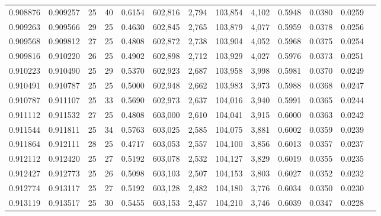 \begin{tabular}{rrrrrrrrrrrrr}
0.908876 & 0.909257 &    25 &  40 &                                     0.6154 & 602,816 &   2,794 & 103,854 &   4,102 & 0.5948 & 0.0380 & 0.0259 \\
0.909263 & 0.909566 &    29 &  25 &                                     0.4630 & 602,845 &   2,765 & 103,879 &   4,077 & 0.5959 & 0.0378 & 0.0256 \\
0.909568 & 0.909812 &    27 &  25 &                                     0.4808 & 602,872 &   2,738 & 103,904 &   4,052 & 0.5968 & 0.0375 & 0.0254 \\
0.909816 & 0.910220 &    26 &  25 &                                     0.4902 & 602,898 &   2,712 & 103,929 &   4,027 & 0.5976 & 0.0373 & 0.0251 \\
0.910223 & 0.910490 &    25 &  29 &                                     0.5370 & 602,923 &   2,687 & 103,958 &   3,998 & 0.5981 & 0.0370 & 0.0249 \\
0.910491 & 0.910787 &    25 &  25 &                                     0.5000 & 602,948 &   2,662 & 103,983 &   3,973 & 0.5988 & 0.0368 & 0.0247 \\
0.910787 & 0.911107 &    25 &  33 &                                     0.5690 & 602,973 &   2,637 & 104,016 &   3,940 & 0.5991 & 0.0365 & 0.0244 \\
0.911112 & 0.911532 &    27 &  25 &                                     0.4808 & 603,000 &   2,610 & 104,041 &   3,915 & 0.6000 & 0.0363 & 0.0242 \\
0.911544 & 0.911811 &    25 &  34 &                                     0.5763 & 603,025 &   2,585 & 104,075 &   3,881 & 0.6002 & 0.0359 & 0.0239 \\
0.911864 & 0.912111 &    28 &  25 &                                     0.4717 & 603,053 &   2,557 & 104,100 &   3,856 & 0.6013 & 0.0357 & 0.0237 \\
0.912112 & 0.912420 &    25 &  27 &                                     0.5192 & 603,078 &   2,532 & 104,127 &   3,829 & 0.6019 & 0.0355 & 0.0235 \\
0.912427 & 0.912773 &    25 &  26 &                                     0.5098 & 603,103 &   2,507 & 104,153 &   3,803 & 0.6027 & 0.0352 & 0.0232 \\
0.912774 & 0.913117 &    25 &  27 &                                     0.5192 & 603,128 &   2,482 & 104,180 &   3,776 & 0.6034 & 0.0350 & 0.0230 \\
0.913119 & 0.913517 &    25 &  30 &                                     0.5455 & 603,153 &   2,457 & 104,210 &   3,746 & 0.6039 & 0.0347 & 0.0228 \\

\end{tabular}
